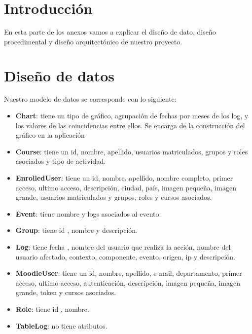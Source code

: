 
\section{Introducción}

En esta parte de los anexos vamos a explicar el diseño de dato, diseño procedimental y diseño arquitectónico de nuestro proyecto.

\section{Diseño de datos}

Nuestro modelo de datos se corresponde con lo siguiente:

\begin{itemize}
	\tightlist
	\item
	\textbf{Chart}: tiene un tipo de gráfico, agrupación de fechas por meses de los log, y los valores de las coincidencias entre ellos. Se encarga de la construcción del gráfico en la aplicación
	\item
	\textbf{Course}: tiene un id, nombre, apellido, usuarios matriculados, grupos y roles asociados y tipo de actividad.
	\item
	\textbf{EnrolledUser}: tiene un id, nombre, apellido, nombre completo, primer acceso, ultimo acceso, descripción, ciudad, país, imagen pequeña, imagen grande, usuarios matriculados y grupos, roles y cursos asociados.
	\item
	\textbf{Event}: tiene nombre y logs asociados al evento.
	\item
	\textbf{Group}: tiene id , nombre y descripción.
	\item
	\textbf{Log}: tiene fecha , nombre del usuario que realiza la acción, nombre del usuario afectado, contexto, componente, evento, origen, ip y descripción.
	\item
	\textbf{MoodleUser}: tiene un id, nombre, apellido, e-mail, departamento, primer acceso, ultimo acceso, autenticación, descripción, imagen pequeña, imagen grande, token y cursos asociados.
	\item
	\textbf{Role}: tiene id , nombre.
	\item
	\textbf{TableLog}: no tiene atributos.
\end{itemize}


